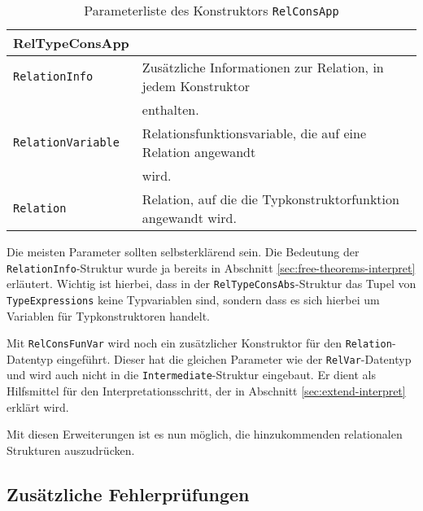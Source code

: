 \begin{table}[th]
\begin{tabular}{ | l | l | }
\hline
RelTypeConsApp & \\
\hline
\texttt{RelationInfo} & Zusätzliche Informationen zur Relation, in jedem Konstruktor \\
& enthalten. \\
\texttt{RelationVariable} & Relationsfunktionsvariable, die auf eine Relation angewandt\\
& wird. \\
\texttt{Relation} & Relation, auf die die Typkonstruktorfunktion angewandt wird. \\
\hline
\end{tabular}
\caption{Parameterliste des Konstruktors \texttt{RelConsApp}}
\label{tab:reltypeconsapp}
\end{table}

Die meisten Parameter sollten selbsterklärend sein. Die Bedeutung der \texttt{RelationInfo}-Struktur wurde ja bereits in Abschnitt \ref{sec:free-theorems-interpret} erläutert. Wichtig ist hierbei, dass in der \texttt{RelTypeConsAbs}-Struktur das
Tupel von \texttt{TypeExpressions} keine Typvariablen sind, sondern dass es sich hierbei um Variablen für Typkonstruktoren handelt.

Mit \texttt{RelConsFunVar} wird noch ein zusätzlicher Konstruktor für den \texttt{Relation}-Datentyp eingeführt. Dieser hat
die gleichen Parameter wie der \texttt{RelVar}-Datentyp und wird auch nicht in die \texttt{Intermediate}-Struktur eingebaut.
Er dient als Hilfsmittel für den Interpretationsschritt, der in Abschnitt \ref{sec:extend-interpret} erklärt wird.

Mit diesen Erweiterungen ist es nun möglich, die hinzukommenden relationalen Strukturen auszudrücken.


\subsection{Zusätzliche Fehlerprüfungen}

\label{sec:erweiterung-typklassen-fehler}


